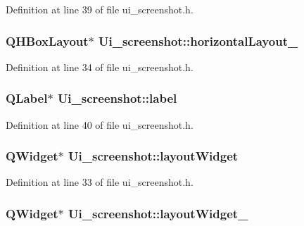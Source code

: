 Definition at line 39 of file ui\_\-screenshot.h.

\hypertarget{classUi__screenshot_a9674ef9297d04ecba53e20df684cd955}{
\subsubsection[{horizontalLayout\_\-2}]{\setlength{\rightskip}{0pt plus 5cm}QHBoxLayout$\ast$ {\bf Ui\_\-screenshot::horizontalLayout\_}}}
\label{classUi__screenshot_a9674ef9297d04ecba53e20df684cd955}


Definition at line 34 of file ui\_\-screenshot.h.

\hypertarget{classUi__screenshot_a748678988896dca422c17f13394f3d90}{
\subsubsection[{label}]{\setlength{\rightskip}{0pt plus 5cm}QLabel$\ast$ {\bf Ui\_\-screenshot::label}}}
\label{classUi__screenshot_a748678988896dca422c17f13394f3d90}


Definition at line 40 of file ui\_\-screenshot.h.

\hypertarget{classUi__screenshot_ab547916593a2a044de05f06d60f00adb}{
\subsubsection[{layoutWidget}]{\setlength{\rightskip}{0pt plus 5cm}QWidget$\ast$ {\bf Ui\_\-screenshot::layoutWidget}}}
\label{classUi__screenshot_ab547916593a2a044de05f06d60f00adb}


Definition at line 33 of file ui\_\-screenshot.h.

\hypertarget{classUi__screenshot_a814d1f5ebdeeb7cb2c083253609f71c2}{
\subsubsection[{layoutWidget\_\-2}]{\setlength{\rightskip}{0pt plus 5cm}QWidget$\ast$ {\bf Ui\_\-screenshot::layoutWidget\_}}}
\label{classUi__screenshot_a814d1f5ebdeeb7cb2c083253609f71c2}


